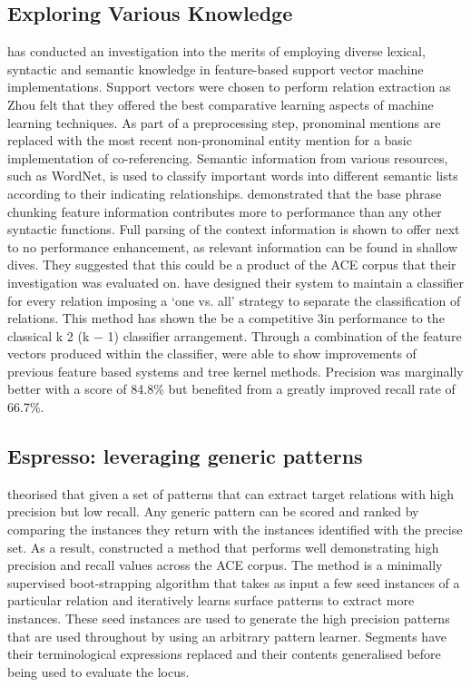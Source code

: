 \documentclass[12pt]{article} %
\begin{document}
\subsection{Exploring Various Knowledge}

\cite{exploringVarious} has conducted an investigation into the merits of employing diverse lexical, syntactic and semantic knowledge in feature-based support vector machine implementations. Support vectors were chosen to perform relation extraction as Zhou felt that they offered the best comparative learning aspects of machine learning techniques. As part of a preprocessing step, pronominal mentions are replaced with the most recent non-pronominal entity mention for a basic implementation of co-referencing. Semantic information from various resources, such as WordNet, is used to classify important words into different semantic lists according to their indicating relationships. \cite{exploringVarious} demonstrated that the base phrase chunking feature information contributes more to performance than any other syntactic functions. Full parsing of the context information is shown to offer next to no performance enhancement, as relevant information can be found in shallow dives. They suggested that this could be a product of the ACE corpus that their investigation was evaluated on. \cite{exploringVarious} have designed their system to maintain a classifier for every relation imposing a ‘one vs. all’ strategy to separate the classification of relations. This method has shown the be a competitive 3in performance to the classical k 2 (k − 1) classifier arrangement. Through a combination of the feature vectors produced within the classifier, \cite{exploringVarious} were able to show improvements of previous feature based systems and tree kernel methods. Precision was marginally better with a score of 84.8\% but benefited from a greatly improved recall rate of 66.7\%.

\subsection{Espresso: leveraging generic patterns}

\cite{espressoExtraction} theorised that given a set of patterns that can extract target relations with high precision but low recall. Any generic pattern can be scored and ranked by comparing the instances they return with the instances identified with the precise set. As a result, \cite{espressoExtraction} constructed a method that performs well demonstrating high precision and recall values across the ACE corpus. The method is a minimally supervised boot-strapping algorithm that takes as input a few seed instances of a particular relation and iteratively learns surface patterns to extract more instances. These seed instances are used to generate the high precision patterns that are used throughout by using an arbitrary pattern learner. Segments have their terminological expressions replaced and their contents generalised before being used to evaluate the locus.
\end{document}
